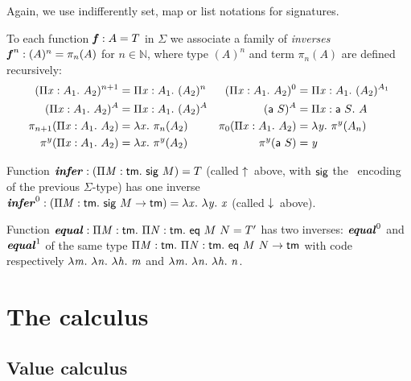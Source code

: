 \documentclass{llncs}
\begin{document}
Again, we use indifferently set, map or list notations for signatures.

\begin{definition}
  To each function $\fct f : A = T$ in $\Sigma$ we associate a family
  of \emph{inverses} $\fcti f n : (A)^n = \pi_n(A)$ for $n\in\mathbb
  N$, where type $(A)^n$ and term $\pi_n(A)$ are defined recursively:
  \begin{align*}
    (\prd x {A_1} {A_2})^{n+1} &= \prd x {A_1} (A_2)^n &
    (\prd x {A_1} {A_2})^0 &= \prd x {A_1} (A_2)^{A_1} \\
    (\prd x {A_1} {A_2})^A &= \prd x {A_1} (A_2)^A &
    (\app {\cst a} S)^A &= \prd x {\app{\cst a} S} A \\
    \pi_{n+1}(\prd x {A_1}{A_2}) &= \lam x \pi_n(A_2) &
    \pi_0(\prd x {A_1} {A_2}) &= \lam {y} \pi^y(A_n) \\
    \pi^y(\prd x {A_1}{A_2}) &= \lam x \pi^y (A_2) &
    \pi^y(\app{\cst a} S) &= \var y
  \end{align*}
\end{definition}

\begin{example}
  Function $\fct{infer} : (\prd M {\cst{tm}} \app{\cst{sig}} M) =
  T$ (called $\finfer{}$ above, with $\cst{sig}$ the \LF\ encoding of
  the previous $\Sigma$-type) has one inverse $\fcti{infer}{0} :
  (\prd M {\cst{tm}} {\app{\cst{sig}} M} \to \cst{tm}) = \lam x \lam y
  \var x$ (called $\fget{}$ above).
\end{example}

\begin{example}
  Function $\fct{equal} : \prd M {\cst{tm}} \prd N {\cst{tm}}
  \app{\cst{eq}}\app M N = T'$ has two inverses: $\fcti{equal}{0}$ and
  $\fcti{equal}{1}$ of the same type $\prd M {\cst{tm}} \prd N
  {\cst{tm}} \app{\cst{eq}}\app M N \to \cst{tm}$ with code
  respectively $\lam m \lam n \lam h \var m$ and $\lam m \lam n \lam h
  \var n$.
\end{example}

\section{The calculus}

\subsection{Value calculus}

\end{document}
